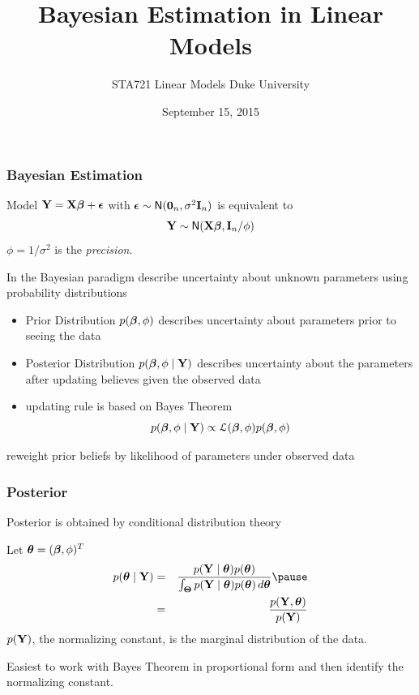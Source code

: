 \documentclass[handout]{beamer}
\title{Bayesian Estimation in Linear Models}
\institute{Merlise Clyde}
\author{STA721 Linear Models Duke University}
\date{September 15, 2015}
\begin{document}
\maketitle

\begin{frame}
  \frametitle{Bayesian Estimation}
  Model $\mathbf{Y} = \mathbf{X} \boldsymbol{\beta} + \boldsymbol{\epsilon}$  with $\boldsymbol{\epsilon} \sim \textsf{N}(\mathbf{0}_n , \sigma^2
  \mathbf{I}_n)$ \pause
is equivalent to 
$$
\mathbf{Y} \sim \textsf{N}(\mathbf{X} \boldsymbol{\beta}, \mathbf{I}_n/\phi)
$$
\pause
 $\phi = 1/\sigma^2$ is the {\it precision}.   
\pause

\vspace{14pt}
In the  Bayesian paradigm describe uncertainty about unknown
parameters using probability distributions
\pause
\begin{itemize}
\item  Prior Distribution $p(\boldsymbol{\beta}, \phi)$ describes uncertainty about
  parameters prior to seeing the data \pause
\item Posterior Distribution $p(\boldsymbol{\beta}, \phi \mid \mathbf{Y})$ describes
  uncertainty about the parameters after updating  believes given the
  observed data \pause
\item updating rule is based on Bayes Theorem
$$p(\boldsymbol{\beta}, \phi \mid \mathbf{Y}) \propto {\cal{L}}(\boldsymbol{\beta}, \phi) p(\boldsymbol{\beta}, \phi)$$
\pause
\end{itemize}
 reweight prior beliefs by likelihood of parameters  under observed data
\end{frame}

\begin{frame}
  \frametitle{Posterior}
  Posterior is obtained by conditional distribution theory \pause

  Let $\boldsymbol{\theta} = (\boldsymbol{\beta}, \phi)^T$ \pause
\begin{eqnarray*}
  p(\t \mid \Y ) & = & \frac{p(\Y \mid \t) p(\t) }
{ \int_{\T} p(\Y \mid \t)   p(\t) \, d\t} \pause \\
& = &  \frac{p(\Y, \t)}{p(\Y)}
\end{eqnarray*}
\pause
$p(\mathbf{Y})$, the normalizing constant, is the marginal distribution of the data.
\pause
\vfill

Easiest to work with Bayes Theorem in proportional form and then
identify the normalizing constant.
\end{frame}
\end{document}
